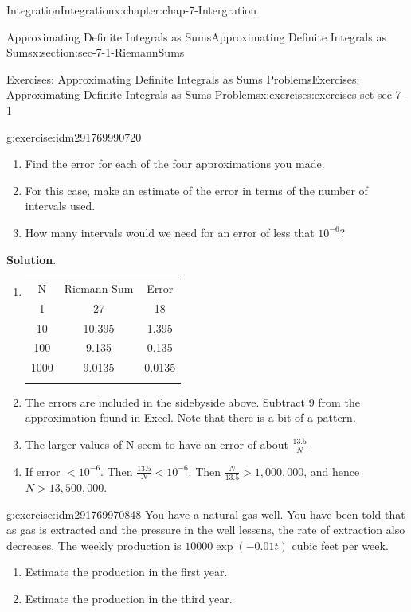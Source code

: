 \documentclass[oneside,10pt,]{book}
\newcommand{\tabularfont}{\relax}
\numberwithin{equation}{section}
\newcommand{\hrulethin}  {\noalign{\hrule height 0.04em}}
\newcommand{\hrulethick} {\noalign{\hrule height 0.11em}}
\newcommand{\lt}{<}
\newcommand{\gt}{>}
\begin{document}
\begin{chapterptx}{Integration}{}{Integration}{}{}{x:chapter:chap-7-Intergration}
\begin{sectionptx}{Approximating Definite Integrals as Sums}{}{Approximating Definite Integrals as Sums}{}{}{x:section:sec-7-1-RiemannSums}
\begin{exercises-subsection}{Exercises: Approximating Definite Integrals as Sums Problems}{}{Exercises: Approximating Definite Integrals as Sums Problems}{}{}{x:exercises:exercises-set-sec-7-1}
\begin{divisionexercise}{9}{}{}{g:exercise:idm291769990720}
\begin{enumerate}[label=(\alph*)]
\item{}Find the error for each of the four approximations you made.%
\item{}For this case, make an estimate of the error in terms of the number of intervals used.%
\item{}How many intervals would we need for an error of less that \(10^{-6}\)?%
\end{enumerate}
\par\smallskip%
\noindent\textbf{Solution}.\hypertarget{g:solution:idm291769985840}{}\quad{}%
\begin{enumerate}[label=(\alph*)]
\item{}\begin{sidebyside}{1}{0}{0}{0}%
\begin{sbspanel}{1}%
{\centering%
{\tabularfont%
\begin{tabular}{ccc}\hrulethick
N&Riemann Sum&Error\tabularnewline\hrulethin
1&27&18\tabularnewline\hrulethin
10&10.395&1.395\tabularnewline\hrulethin
100&9.135&0.135\tabularnewline\hrulethin
1000&9.0135&0.0135\tabularnewline\hrulethin
\end{tabular}
}%
\par}
\end{sbspanel}%
\end{sidebyside}%
%
\item{}The errors are included in the sidebyside above. Subtract 9 from the approximation found in Excel.  Note that there is a bit of a pattern.%
\item{}The larger values of N seem to have an error of about \(\frac{13.5}{N}\)%
\item{}If  error \(\lt 10^{-6}\). Then \(\frac{13.5}{N}\lt 10^{-6}\). Then \(\frac{N}{13.5}\gt 1,000,000\), and hence \(N\gt 13,500,000\).%
\end{enumerate}
\end{divisionexercise}%
\begin{divisionexercise}{10}{}{}{g:exercise:idm291769970848}%
You have a natural gas well.  You have been told that as gas is extracted and the pressure in the well lessens, the rate of extraction also decreases. The weekly production is \(10000 \exp(-0.01 t)\) cubic feet per week.%
%
\begin{enumerate}[label=(\alph*)]
\item{}Estimate the production in the first year.%
\item{}Estimate the production in the third year.%
\end{enumerate}
\end{divisionexercise}%

\end{exercises-subsection}
\end{sectionptx}
\end{chapterptx}
\end{document}
